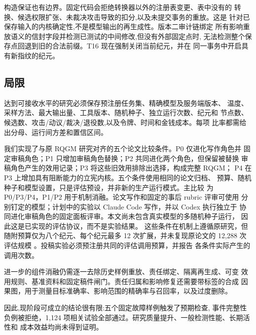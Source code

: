 构造保证也有边界。固定代码会拒绝转换器以外的注册表变更、表中没有的
转换、候选权限扩张、未裁决攻击导致的扣分,以及未提交事务的重放。这是
针对已保存输入的内核确定性,不是模型输出的再生成性。版本二审计链绑定
所有影响重放语义的信封字段并检测已测试的中间修改,但没有外部固定点时,
无法检测整个保存点回退到旧的合法前缀。T16 现在强制关闭当前纪元，并在
同一事务中开启具有新指纹的纪元。

\subsection{局限}\label{sec:eval:limits}

达到可接收水平的研究必须保存预注册任务集、精确模型及服务端版本、
温度、采样方法、最大输出量、工具版本、随机种子、独立运行次数、纪元和
节点数、候选数、攻击/动议/裁决/退役数,以及令牌、时间和金钱成本。每项
比率都需给出分母、运行间方差和置信区间。

我们实现了与原 RQGM 研究对齐的五个论文比较条件。P0 仅进化写作角色并
固定审稿角色；P1 只增加审稿角色替换；P2 共同进化两个角色，但保留被替换
审稿角色产生的效用记录；P3 将这些旧效用排除出选择，构成完整 RQGM；
P4 在 P3 上增加具有阻断能力的立宪内核。五个条件使用相同的论文归档、
预算、随机种子和模型设置，只是评估预设，并非新的生产运行模式。主比较
为 P0/P3/P4，P1/P2 用于机制消融。论文写作和固定的事后 rubric 评审可使用
分别钉定的模型；计划中的实验以 Claude Code 写作，并以 Codex 执行独立于
协同进化审稿角色的固定面板评审。本文尚未包含真实模型的多随机种子运行，
因此这是已实现的评估协议，而不是实验结果。
这些条件在机制上遵循原研究，但随附预算仅为八个纪元、每个纪元最多
12 次扩展，并未复现原论文的 12,288 次评估规模
\cite{iacob2026red}。投稿实验必须预注册共同的评估调用预算，并报告
各条件实际产生的调用次数。

进一步的组件消融仍需逐一去除历史样例重放、责任绑定、隔离再生成、可变
效用规则、基准资料和固定稿件闸门。责任归属和影响修复还需要带标签的合成
因果图，用于测量目标准确率、影响范围的精确率与召回率，以及过度删除。

因此,现阶段可成立的结论很有限:五个固定故障样例触发了预期检查,
事件完整性负例被拒绝，1,124 项相关试验全部通过。研究质量提升、一般检测性能、长期活性和
成本效益均尚未得到证明。
